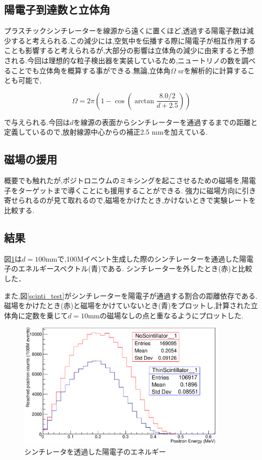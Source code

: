\subsection{陽電子到達数と立体角}

プラスチックシンチレーターを線源から遠くに置くほど,透過する陽電子数は減少すると考えられる.この減少には,空気中を伝播する際に陽電子が相互作用することも影響すると考えられるが,大部分の影響は立体角の減少に由来すると予想される.今回は理想的な粒子検出器を実装しているため,ニュートリノの数を調べることでも立体角を概算する事ができる.無論,立体角$\Omega$ srを解析的に計算することも可能で,

\begin{equation}
	\Omega = 2\pi \left( 1-\cos\left(\arctan\frac{8.0/2}{d+2.5}\right)\right)
\end{equation}

で与えられる.今回は$d$を線源の表面からシンチレーターを通過するまでの距離と定義しているので,放射線源中心からの補正2.5 mmを加えている.

\subsection{磁場の援用}
概要でも触れたが,ポジトロニウムのミキシングを起こさせるための磁場を,陽電子をターゲットまで導くことにも援用することができる.
強力に磁場方向に引き寄せられるのが見て取れるので,磁場をかけたとき,かけないときで実験レートを比較する.

\subsection{結果}

図\ref{test1}は$d=100$mmで,100Mイベント生成した際のシンチレーターを通過した陽電子のエネルギースペクトル(青)である. シンチレーターを外したとき(赤)と比較した．

また,図\ref{scinti_test}がシンチレーターを陽電子が通過する割合の距離依存である.磁場をかけたとき(赤)と磁場をかけていないとき(青)をプロットし,計算された立体角に定数を乗じて$d=10$mmの磁場なしの点と重なるようにプロットした.

\begin{figure}[htbp]
	\centering
		\includegraphics[width=10cm]{fig/test1.pdf}
	\caption{シンチレータを透過した陽電子のエネルギー}
	\label{test1}
\end{figure}


